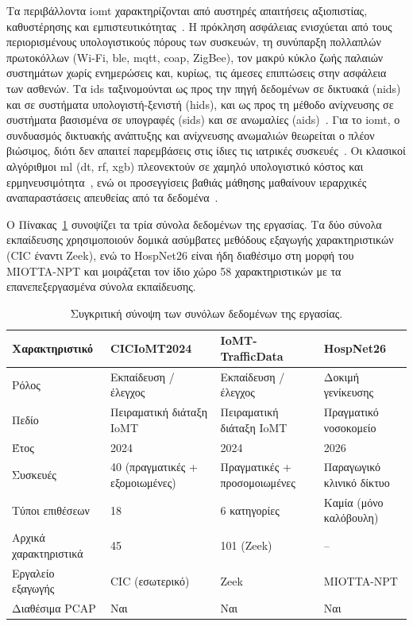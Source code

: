 

Τα περιβάλλοντα \gls{iomt} χαρακτηρίζονται από αυστηρές απαιτήσεις αξιοπιστίας, καθυστέρησης και εμπιστευτικότητας~\cite{dimitrov2016medical}. Η πρόκληση ασφάλειας ενισχύεται από τους περιορισμένους υπολογιστικούς πόρους των συσκευών, τη συνύπαρξη πολλαπλών πρωτοκόλλων (Wi-Fi, \gls{ble}, \gls{mqtt}, \gls{coap}, ZigBee), τον μακρύ κύκλο ζωής παλαιών συστημάτων χωρίς ενημερώσεις και, κυρίως, τις άμεσες επιπτώσεις στην ασφάλεια των ασθενών. Τα \gls{ids} ταξινομούνται ως προς την πηγή δεδομένων σε δικτυακά (\gls{nids}) και σε συστήματα υπολογιστή-ξενιστή (\gls{hids}), και ως προς τη μέθοδο ανίχνευσης σε συστήματα βασισμένα σε υπογραφές (\gls{sids}) και σε ανωμαλίες (\gls{aids})~\cite{khraisat2019survey}. Για το \gls{iomt}, ο συνδυασμός δικτυακής ανάπτυξης και ανίχνευσης ανωμαλιών θεωρείται ο πλέον βιώσιμος, διότι δεν απαιτεί παρεμβάσεις στις ίδιες τις ιατρικές συσκευές~\cite{domenech2024ensuring, weber2023attack}. Οι κλασικοί αλγόριθμοι \gls{ml} (\gls{dt}, \gls{rf}, \gls{xgb}) πλεονεκτούν σε χαμηλό υπολογιστικό κόστος και ερμηνευσιμότητα~\cite{heidari2023iot}, ενώ οι προσεγγίσεις βαθιάς μάθησης μαθαίνουν ιεραρχικές αναπαραστάσεις απευθείας από τα δεδομένα~\cite{lopez2025nprint}.


Ο Πίνακας~\ref{gr:tab:datasets} συνοψίζει τα τρία σύνολα δεδομένων της εργασίας. Τα δύο σύνολα εκπαίδευσης χρησιμοποιούν δομικά ασύμβατες μεθόδους εξαγωγής χαρακτηριστικών (CIC έναντι Zeek), ενώ το HospNet26 είναι ήδη διαθέσιμο στη μορφή του MIOTTA-NPT και μοιράζεται τον ίδιο χώρο 58 χαρακτηριστικών με τα επανεπεξεργασμένα σύνολα εκπαίδευσης.

\begin{table}[!htbp]
\centering
\caption[]{Συγκριτική σύνοψη των συνόλων δεδομένων της εργασίας.}
\label{gr:tab:datasets}
\small
\begin{tabularx}{\textwidth}{@{}l X X X@{}}
\toprule
\textbf{Χαρακτηριστικό} & \textbf{CICIoMT2024} & \textbf{IoMT-TrafficData} & \textbf{HospNet26} \\
\midrule
Ρόλος & Εκπαίδευση / έλεγχος & Εκπαίδευση / έλεγχος & Δοκιμή γενίκευσης \\
Πεδίο & Πειραματική διάταξη IoMT & Πειραματική διάταξη IoMT & Πραγματικό νοσοκομείο \\
Έτος & 2024 & 2024 & 2026 \\
Συσκευές & 40 (πραγματικές + εξομοιωμένες) & Πραγματικές + προσομοιωμένες & Παραγωγικό κλινικό δίκτυο \\
Τύποι επιθέσεων & 18 & 6 κατηγορίες & Καμία (μόνο καλόβουλη) \\
Αρχικά χαρακτηριστικά & 45 & 101 (Zeek) & -- \\
Εργαλείο εξαγωγής & CIC (εσωτερικό) & Zeek & MIOTTA-NPT \\
Διαθέσιμα PCAP & Ναι & Ναι & Ναι \\
\bottomrule
\end{tabularx}
\end{table}

